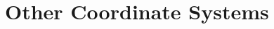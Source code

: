 \documentclass[../precalc.tex]{subfiles}
\begin{document}
\chapter{Other Coordinate Systems}
\end{document}

